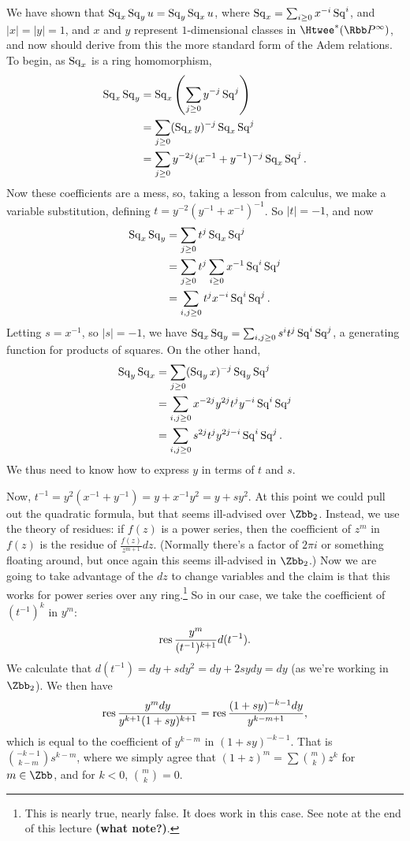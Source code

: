 We have shown that $\operatorname{Sq}_x \operatorname{Sq}_y u = \operatorname{Sq}_y \operatorname{Sq}_x u$, where $\operatorname{Sq}_x = \sum_{i \ge 0} x^{-i} \operatorname{Sq}^i$, and $|x| = |y| = 1$, and $x$ and $y$ represent $1$-dimensional classes in $\Htwee^* (\RP^\infty)$, and now should derive from this the more standard form of the Adem relations. To begin, as $\operatorname{Sq}_x$ is a ring homomorphism,
\begin{align*}
\operatorname{Sq}_x \operatorname{Sq}_y & = \operatorname{Sq}_x \left( \sum_{j \ge 0} y^{-j} \operatorname{Sq}^j \right) \\
& = \sum_{j \ge 0}(\operatorname{Sq}_x y)^{-j} \operatorname{Sq}_x \operatorname{Sq}^j \\
& = \sum_{j \ge 0} y^{-2j}(x^{-1} + y^{-1})^{-j} \operatorname{Sq}_x \operatorname{Sq}^j.
\end{align*}
Now these coefficients are a mess, so, taking a lesson from calculus, we make a variable substitution, defining $t = y^{-2}(y^{-1} + x^{-1})^{-1}$.  So $|t| = -1$, and now
\begin{align*}
\operatorname{Sq}_x \operatorname{Sq}_y & = \sum_{j \ge 0} t^j \operatorname{Sq}_x \operatorname{Sq}^j \\
& = \sum_{j \ge 0} t^j \sum_{i \ge 0} x^{-1} \operatorname{Sq}^i \operatorname{Sq}^j \\
& = \sum_{i, j \ge 0} t^j x^{-i} \operatorname{Sq}^i \operatorname{Sq}^j.
\end{align*}
Letting $s = x^{-1}$, so $|s| = -1$, we have $\operatorname{Sq}_x \operatorname{Sq}_y = \sum_{i, j \ge 0} s^i t^j \operatorname{Sq}^i \operatorname{Sq}^j$, a generating function for products of squares.  On the other hand,
\begin{align*}
\operatorname{Sq}_y \operatorname{Sq}_x & = \sum_{j \ge 0}(\operatorname{Sq}_y x)^{-j} \operatorname{Sq}_y \operatorname{Sq}^j \\
& = \sum_{i, j \ge 0} x^{-2j} y^{2j} t^j y^{-i} \operatorname{Sq}^i \operatorname{Sq}^j \\
& = \sum_{i, j \ge 0} s^{2j} t^j y^{2j-i} \operatorname{Sq}^i \operatorname{Sq}^j.
\end{align*}
We thus need to know how to express $y$ in terms of $t$ and $s$.

Now, $t^{-1} = y^2(x^{-1} + y^{-1}) = y + x^{-1} y^2 = y + s y^2$.  At this point we could pull out the quadratic formula, but that seems ill-advised over $\Zbb_2$.  Instead, we use the theory of residues: if $f(z)$ is a power series, then the coefficient of $z^m$ in $f(z)$ is the residue of $\frac{f(z)}{z^{m+1}}dz$.  (Normally there's a factor of $2 \pi i$ or something floating around, but once again this seems ill-advised in $\Zbb_2$.)  Now we are going to take advantage of the $dz$ to change variables and the claim is that this works for power series over any ring.\footnote{This is nearly true, nearly false.  It does work in this case.  See note at the end of this lecture \textbf{(what note?)}. %
}  So in our case, we take the coefficient of $(t^{-1})^k$ in $y^m$: \[\operatorname{res} \frac{y^m}{(t^{-1})^{k+1}} d(t^{-1}).\]  We calculate that $d(t^{-1}) = dy + sdy^2 = dy + 2sydy = dy$ (as we're working in $\Zbb_2$).  We then have
\[\operatorname{res} \frac{y^m dy}{y^{k+1}(1 + sy)^{k+1}} = \operatorname{res} \frac{(1+sy)^{-k-1} dy}{y^{k-m+1}},\]
which is equal to the coefficient of $y^{k-m}$ in $(1+sy)^{-k-1}$. That is $\binom{-k-1}{k-m}s^{k-m}$, where we simply agree that $(1 + z)^m = \sum \binom{m}{k} z^k$ for $m \in \Zbb$, and for $k < 0$, $\binom{m}{k} = 0$.


